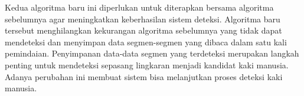 Kedua algoritma baru ini diperlukan untuk diterapkan bersama algoritma sebelumnya agar meningkatkan keberhasilan sistem deteksi. Algoritma baru tersebut menghilangkan kekurangan algoritma sebelumnya yang tidak dapat mendeteksi dan menyimpan data segmen-segmen yang dibaca dalam satu kali pemindaian. Penyimpanan data-data segmen yang terdeteksi merupakan langkah penting untuk mendeteksi sepasang lingkaran menjadi kandidat kaki manusia. Adanya perubahan ini membuat sistem bisa melanjutkan proses deteksi kaki manusia.



